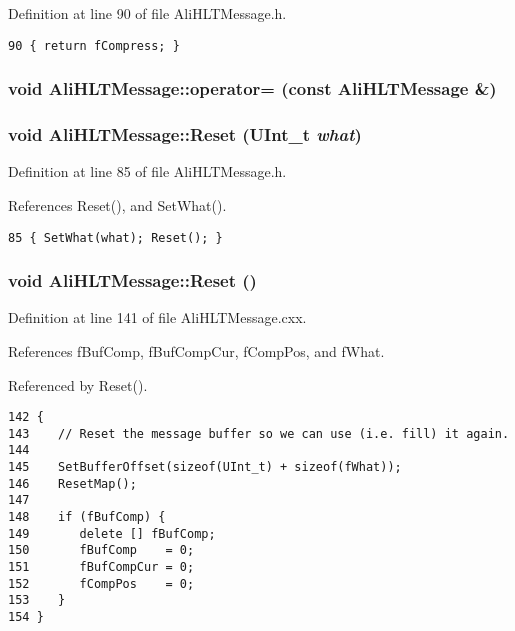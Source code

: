 Definition at line 90 of file Ali\-HLTMessage.h.

\footnotesize\begin{verbatim}90 { return fCompress; }
\end{verbatim}\normalsize 


\subsubsection{\setlength{\rightskip}{0pt plus 5cm}void Ali\-HLTMessage::operator= (const {\bf Ali\-HLTMessage} \&)\hspace{0.3cm}{\tt  [private]}}\label{classAliHLTMessage_d1}


\subsubsection{\setlength{\rightskip}{0pt plus 5cm}void Ali\-HLTMessage::Reset (UInt\_\-t {\em what})\hspace{0.3cm}{\tt  [inline]}}\label{classAliHLTMessage_a7}




Definition at line 85 of file Ali\-HLTMessage.h.

References Reset(), and Set\-What().

\footnotesize\begin{verbatim}85 { SetWhat(what); Reset(); }
\end{verbatim}\normalsize 


\subsubsection{\setlength{\rightskip}{0pt plus 5cm}void Ali\-HLTMessage::Reset ()}\label{classAliHLTMessage_a6}




Definition at line 141 of file Ali\-HLTMessage.cxx.

References f\-Buf\-Comp, f\-Buf\-Comp\-Cur, f\-Comp\-Pos, and f\-What.

Referenced by Reset().

\footnotesize\begin{verbatim}142 {
143    // Reset the message buffer so we can use (i.e. fill) it again.
144 
145    SetBufferOffset(sizeof(UInt_t) + sizeof(fWhat));
146    ResetMap();
147 
148    if (fBufComp) {
149       delete [] fBufComp;
150       fBufComp    = 0;
151       fBufCompCur = 0;
152       fCompPos    = 0;
153    }
154 }
\end{verbatim}\normalsize 


